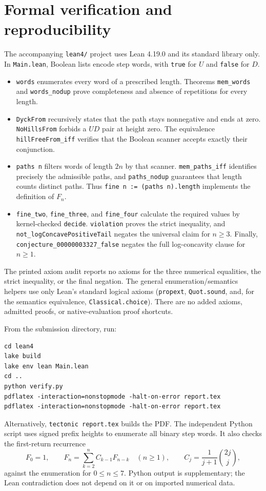 \documentclass[11pt,a4paper]{article}
\begin{document}
\section{Formal verification and reproducibility}
The accompanying \texttt{lean4/} project uses Lean 4.19.0 and its
standard library only. In \texttt{Main.lean}, Boolean lists encode
step words, with \texttt{true} for $U$ and \texttt{false} for $D$.
\begin{itemize}
\item \texttt{words} enumerates every word of a prescribed length.
Theorems \texttt{mem\_words} and \texttt{words\_nodup} prove
completeness and absence of repetitions for every length.
\item \texttt{DyckFrom} recursively states that the path stays
nonnegative and ends at zero. \texttt{NoHillsFrom} forbids a $UD$
pair at height zero. The equivalence \texttt{hillFreeFrom\_iff}
verifies that the Boolean scanner accepts exactly their conjunction.
\item \texttt{paths n} filters words of length $2n$ by that scanner.
\texttt{mem\_paths\_iff} identifies precisely the admissible paths,
and \texttt{paths\_nodup} guarantees that length counts distinct paths.
Thus \texttt{fine n := (paths n).length} implements the definition of $F_n$.
\item \texttt{fine\_two}, \texttt{fine\_three}, and \texttt{fine\_four}
calculate the required values by kernel-checked \texttt{decide}.
\texttt{violation} proves the strict inequality, and
\texttt{not\_logConcavePositiveTail} negates the universal claim
for $n\geq3$. Finally, \texttt{conjecture\_00000003327\_false}
negates the full log-concavity clause for $n\geq1$.
\end{itemize}

The printed axiom audit reports no axioms for the three numerical
equalities, the strict inequality, or the final negation.
The general enumeration/semantics helpers use only Lean's standard
logical axioms (\texttt{propext}, \texttt{Quot.sound}, and, for the
semantics equivalence, \texttt{Classical.choice}). There are no added
axioms, admitted proofs, or native-evaluation proof shortcuts.

From the submission directory, run:
\begin{verbatim}
cd lean4
lake build
lake env lean Main.lean
cd ..
python verify.py
pdflatex -interaction=nonstopmode -halt-on-error report.tex
pdflatex -interaction=nonstopmode -halt-on-error report.tex
\end{verbatim}
Alternatively, \texttt{tectonic report.tex} builds the PDF.
The independent Python script uses signed prefix heights to enumerate
all binary step words. It also checks the first-return recurrence
\[
  F_0=1,\qquad
  F_n=\sum_{k=2}^{n}C_{k-1}F_{n-k}\quad(n\geq1),
  \qquad C_j=\frac{1}{j+1}\binom{2j}{j},
\]
against the enumeration for $0\leq n\leq7$.
Python output is supplementary; the Lean contradiction does not
depend on it or on imported numerical data.
\end{document}
